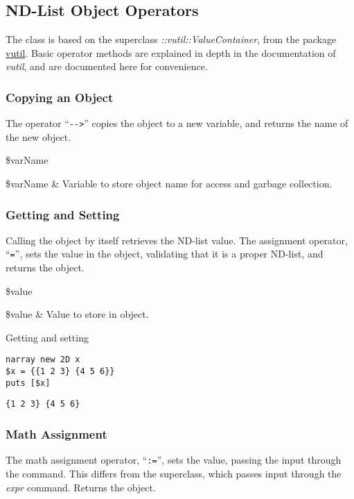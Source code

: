 \clearpage
\subsection{ND-List Object Operators}
The class  is based on the superclass \textit{::vutil::ValueContainer}, from the package \textcolor{blue}{\href{https://github.com/ambaker1/vutil}{vutil}}.
Basic operator methods are explained in depth in the documentation of \textit{vutil}, and are documented here for convenience.

\subsubsection{Copying an Object}
The operator ``\texttt{-{}->}'' copies the object to a new variable, and returns the name of the new object.
\begin{syntax}
 \$varName
\end{syntax}
\begin{args}
\$varName & Variable to store object name for access and garbage collection. 
\end{args}

\subsubsection{Getting and Setting}
Calling the object by itself retrieves the ND-list value.
The assignment operator, ``\texttt{=}'', sets the value in the object, validating that it is a proper ND-list, and returns the object.

\begin{syntax}
 \$value
\end{syntax}
\begin{args}
\$value & Value to store in object. 
\end{args}

\begin{example}{Getting and setting}
\begin{lstlisting}
narray new 2D x
$x = {{1 2 3} {4 5 6}}
puts [$x]
\end{lstlisting}
\tcblower
\begin{lstlisting}
{1 2 3} {4 5 6}
\end{lstlisting}
\end{example}
\clearpage
\subsubsection{Math Assignment}
The math assignment operator, ``\texttt{:=}'', sets the value, passing the input through the  command. 
This differs from the superclass, which passes input through the \textit{expr} command.
Returns the object.

